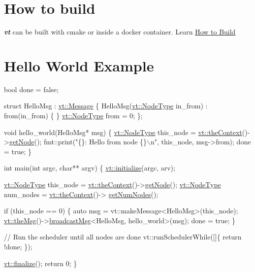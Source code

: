 \hypertarget{introduction_how-to-build-intro}{}\section{How to build}\label{introduction_how-to-build-intro}
{\bfseries {\itshape vt}} can be built with cmake or inside a docker container. Learn \hyperlink{vt-build}{How to Build}\hypertarget{introduction_vt-hello-world}{}\section{Hello World Example}\label{introduction_vt-hello-world}
  
\begin{DoxyCode}
\textcolor{keywordtype}{bool} done = \textcolor{keyword}{false};

\textcolor{keyword}{struct }HelloMsg : \hyperlink{structvt_1_1messaging_1_1_active_msg}{vt::Message} \{
  HelloMsg(\hyperlink{namespacevt_a866da9d0efc19c0a1ce79e9e492f47e2}{vt::NodeType} in\_from) : from(in\_from) \{ \}
  \hyperlink{namespacevt_a866da9d0efc19c0a1ce79e9e492f47e2}{vt::NodeType} from = 0;
\};

\textcolor{keywordtype}{void} hello\_world(HelloMsg* msg) \{
  \hyperlink{namespacevt_a866da9d0efc19c0a1ce79e9e492f47e2}{vt::NodeType} this\_node = \hyperlink{namespacevt_a26551fe0e6e6a1371111df5b12c7e92c}{vt::theContext}()->\hyperlink{structvt_1_1ctx_1_1_context_a0d52c263ce8516546a67443d9a86fa5f}{getNode}();
  fmt::print(\textcolor{stringliteral}{"\{\}: Hello from node \{\}\(\backslash\)n"}, this\_node, msg->from);
  done = \textcolor{keyword}{true};
\}

\textcolor{keywordtype}{int} main(\textcolor{keywordtype}{int} argc, \textcolor{keywordtype}{char}** argv) \{
  \hyperlink{namespacevt_aae6ab5af3e11886ce73c4c3ffa008201}{vt::initialize}(argc, arv);

  \hyperlink{namespacevt_a866da9d0efc19c0a1ce79e9e492f47e2}{vt::NodeType} this\_node = \hyperlink{namespacevt_a26551fe0e6e6a1371111df5b12c7e92c}{vt::theContext}()->\hyperlink{structvt_1_1ctx_1_1_context_a0d52c263ce8516546a67443d9a86fa5f}{getNode}();
  \hyperlink{namespacevt_a866da9d0efc19c0a1ce79e9e492f47e2}{vt::NodeType} num\_nodes = \hyperlink{namespacevt_a26551fe0e6e6a1371111df5b12c7e92c}{vt::theContext}()->
      \hyperlink{structvt_1_1ctx_1_1_context_a7f41071aadf6d5fa9e1b6c703c5ff19d}{getNumNodes}();

  \textcolor{keywordflow}{if} (this\_node == 0) \{
    \textcolor{keyword}{auto} msg = vt::makeMessage<HelloMsg>(this\_node);
    \hyperlink{namespacevt_aeafd31f866aeb4dc6fc2f6ee97136350}{vt::theMsg}()->\hyperlink{group__typesafehan_ga1a347aac6b6b8d47c9b1c8cc11b7f33e}{broadcastMsg}<HelloMsg, hello\_world>(msg);
    done = \textcolor{keyword}{true};
  \}

  \textcolor{comment}{// Run the scheduler until all nodes are done}
  vt::runSchedulerWhile([]\{ \textcolor{keywordflow}{return} !done; \});

  \hyperlink{namespacevt_a540d90dbd6e97b69f1dcbc9ee9314cff}{vt::finalize}();
  \textcolor{keywordflow}{return} 0;
\}
\end{DoxyCode}


